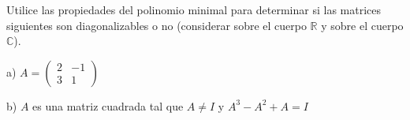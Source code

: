  \begin{exercise} 

\item
 \noindent
 Utilice las propiedades del polinomio minimal para determinar si las matrices siguientes son diagonalizables o no (considerar sobre el cuerpo $\mathbb{R}$ y sobre el cuerpo $\mathbb{C}$).
 
\bigskip
 
 
a) $A=\left(\begin{array}{cc}2 & -1 \\3 & 1
\end{array}
 \right)$
 
 \bigskip
 
b) $A$ es una matriz cuadrada tal que $A \neq I$ y $A^3-A^2+A=I$
\end{exercise}  
 




\bigskip


